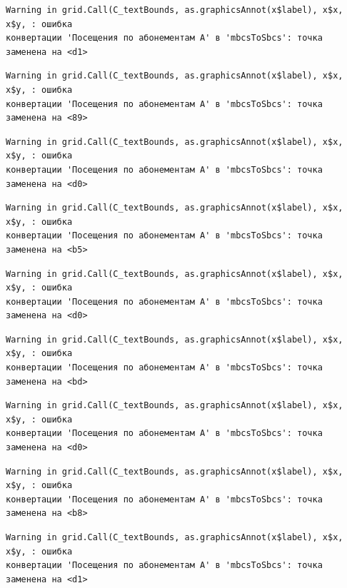 \documentclass[
  letterpaper,
  DIV=11,
  numbers=noendperiod]{scrreprt}
\begin{document}
\begin{verbatim}
Warning in grid.Call(C_textBounds, as.graphicsAnnot(x$label), x$x, x$y, : ошибка
конвертации 'Посещения по абонементам А' в 'mbcsToSbcs': точка заменена на <d1>
\end{verbatim}

\begin{verbatim}
Warning in grid.Call(C_textBounds, as.graphicsAnnot(x$label), x$x, x$y, : ошибка
конвертации 'Посещения по абонементам А' в 'mbcsToSbcs': точка заменена на <89>
\end{verbatim}

\begin{verbatim}
Warning in grid.Call(C_textBounds, as.graphicsAnnot(x$label), x$x, x$y, : ошибка
конвертации 'Посещения по абонементам А' в 'mbcsToSbcs': точка заменена на <d0>
\end{verbatim}

\begin{verbatim}
Warning in grid.Call(C_textBounds, as.graphicsAnnot(x$label), x$x, x$y, : ошибка
конвертации 'Посещения по абонементам А' в 'mbcsToSbcs': точка заменена на <b5>
\end{verbatim}

\begin{verbatim}
Warning in grid.Call(C_textBounds, as.graphicsAnnot(x$label), x$x, x$y, : ошибка
конвертации 'Посещения по абонементам А' в 'mbcsToSbcs': точка заменена на <d0>
\end{verbatim}

\begin{verbatim}
Warning in grid.Call(C_textBounds, as.graphicsAnnot(x$label), x$x, x$y, : ошибка
конвертации 'Посещения по абонементам А' в 'mbcsToSbcs': точка заменена на <bd>
\end{verbatim}

\begin{verbatim}
Warning in grid.Call(C_textBounds, as.graphicsAnnot(x$label), x$x, x$y, : ошибка
конвертации 'Посещения по абонементам А' в 'mbcsToSbcs': точка заменена на <d0>
\end{verbatim}

\begin{verbatim}
Warning in grid.Call(C_textBounds, as.graphicsAnnot(x$label), x$x, x$y, : ошибка
конвертации 'Посещения по абонементам А' в 'mbcsToSbcs': точка заменена на <b8>
\end{verbatim}

\begin{verbatim}
Warning in grid.Call(C_textBounds, as.graphicsAnnot(x$label), x$x, x$y, : ошибка
конвертации 'Посещения по абонементам А' в 'mbcsToSbcs': точка заменена на <d1>
\end{verbatim}
\end{document}
